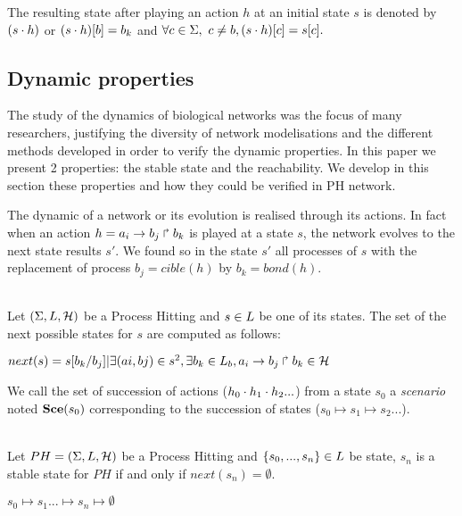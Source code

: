The resulting state after playing an action $h$ at an initial state $s$ is denoted by $(s \cdot h)$ or $(s \cdot h)[b]=b_k$ and $\forall c \in \Sigma, ~ c \neq b, (s \cdot h)[c]=s[c].$

\subsection*{Dynamic properties}

The study of the dynamics of biological networks was the focus of many researchers, justifying the diversity of network modelisations and the different methods developed in order to verify the dynamic properties. In this paper we present 2 properties: the stable state and the reachability. We develop in this section these properties and how they could be verified in PH network. 

The dynamic of a network or its evolution is realised through its actions. In fact when an action $h = a_i\rightarrow b_j\Rsh b_k$ is played at a state $s$, the network evolves to the next state results $s'$. We found so in the state $s'$ all processes of $s$ with the replacement of process $b_j=cible(h)$ by $b_k=bond(h)$.

\begin{definition}
\label{def:NextState} \\
Let $(\Sigma,L,\mathcal{H})$ be a Process Hitting and $s \in L$ be
one of its states. The set of the next possible states for $s$ are computed as follows:
\begin{center}
$next(s) = {s[b_k /b_j ]| \exists (a i , b j ) \in s^2 , \exists b_k \in L_b , a_i\rightarrow b_j\Rsh b_k \in \mathcal{H}}$
\end{center}
\end{definition}

We call the set of succession of actions ($h_0 \cdot h_1 \cdot h_2...$) from a state $ s_0 $ a \emph{scenario} noted $\mathbf{Sce}(s_0)$ corresponding to the succession of states ($s_0 \mapsto s_1 \mapsto s_2 ...$).

\begin{definition} \\
\label{def:FixPoint1}
Let $PH = (\Sigma,L,\mathcal{H})$ be a Process Hitting and
$ \{s_0,..., s_n\} \in L$ be state, $s_n$ is a stable state for $PH$ if and only if $next(s_n) = \emptyset $.
\begin{center}
$s_0 \mapsto s_1 ... \mapsto s_n \mapsto \emptyset $
\end{center}
\end{definition}

